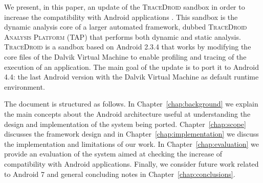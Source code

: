 We present, in this paper, an update of the \textsc{TraceDroid} sandbox in
order to increase the compatibility with Android applications
\cite{ref1}. This sandbox is the dynamic analysis core of a larger
automated framework, dubbed \textsc{TraceDroid Analysis Platform (TAP)}
that performs both dynamic and static analysis. \textsc{TraceDroid} is a sandbox based on Android 2.3.4 that works
by modifying the core files of the Dalvik Virtual Machine to enable
profiling and tracing of the execution of an application. The
main goal of the update is to port it to Android 4.4: the last Android
version with the Dalvik Virtual Machine as default runtime
environment.

The document is structured as follows. In
Chapter~\ref{chap:background} we explain the main concepts about the
Android architecture useful at understanding the design and
implementation of the system being ported. Chapter~\ref{chap:scope}
discusses the framework design and in
Chapter~\ref{chap:implementation} we discuss the implementation and
limitations of our work. In Chapter~\ref{chap:evaluation} we provide
an evaluation of the system aimed at checking the increase of
compatibility with Android applications. Finally, we consider future
work related to Android 7 and general concluding notes in
Chapter~\ref{chap:conclusions}.
